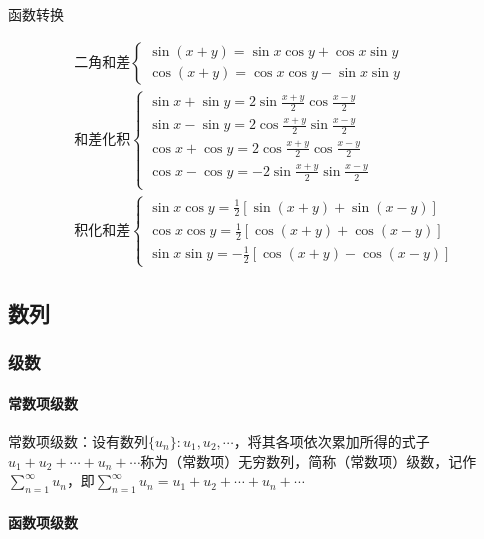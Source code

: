 \documentclass[12pt]{book}
\begin{document}
函数转换


\begin{align*}
&\text{二角和差}\begin{cases}
    \sin(x+y) = \sin{x}\cos{y}+\cos{x}\sin{y} \\
    \cos(x+y) = \cos{x}\cos{y}-\sin{x}\sin{y}
\end{cases}\\
&\text{和差化积}\begin{cases}
    \sin{x}+\sin{y} = 2 \sin{\frac{x+y}{2}}\cos{\frac{x-y}{2}}\\
    \sin{x}-\sin{y} = 2 \cos{\frac{x+y}{2}}\sin{\frac{x-y}{2}}\\
    \cos{x}+\cos{y} = 2 \cos{\frac{x+y}{2}}\cos{\frac{x-y}{2}}\\
    \cos{x}-\cos{y} = -2\sin{\frac{x+y}{2}}\sin{\frac{x-y}{2}}\\
\end{cases}\\
&\text{积化和差}\begin{cases}
    \sin{x}\cos{y} = \frac{1}{2} [\sin{(x+y)}+\sin{(x-y)}] \\
    \cos{x}\cos{y} = \frac{1}{2} [\cos{(x+y)}+\cos{(x-y)}] \\
    \sin{x}\sin{y} =-\frac{1}{2} [\cos{(x+y)}-\cos{(x-y)}]
\end{cases}
\end{align*}




\subsection{数列}



\subsubsection{级数}



\paragraph{常数项级数}
常数项级数：设有数列$\{u_n\}: u_{1},u_{2},\cdots$，将其各项依次累加所得的式子$u_{1}+u_{2}+\cdots+u_{n}+\cdots$称为（常数项）无穷数列，简称（常数项）级数，记作$\sum_{n=1}^{\infty}{u_n}$，即$\sum_{n=1}^{\infty}{u_n} = u_{1}+u_{2}+\cdots+u_{n}+\cdots$

\paragraph{函数项级数}
\end{document}
